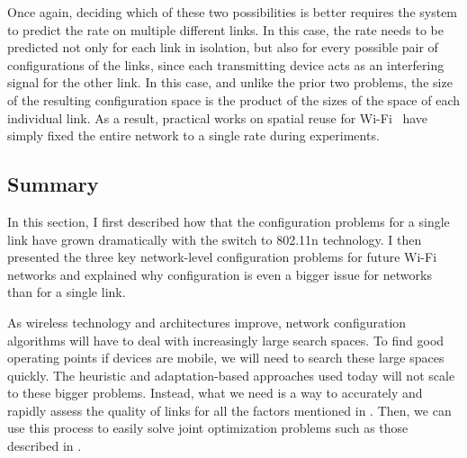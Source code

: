 Once again, deciding which of these two possibilities is better requires the system to predict the rate on multiple different links. In this case, the rate needs to be predicted not only for each link in isolation, but also for every possible pair of configurations of the links, since each transmitting device acts as an interfering signal for the other link. In this case, and unlike the prior two problems, the size of the resulting configuration space is the product of the sizes of the space of each individual link. As a result, practical works on spatial reuse for Wi-Fi~\cite{Shrivastava_CENTAUR,Vutukuru_CMAP} have simply fixed the entire network to a single rate during experiments.

\subsection{Summary}
In this section, I first described how that the configuration problems for a single link have grown dramatically with the switch to 802.11n technology. I then presented the three key network-level configuration problems for future Wi-Fi networks and explained why configuration is even a bigger issue for networks than for a single link.

As wireless technology and architectures improve, network configuration algorithms will have to deal with increasingly large search spaces. To find good operating points if devices are mobile, we will need to search these large spaces quickly.
The heuristic and adaptation-based approaches used today will not scale to these bigger problems. %
Instead, what we need is a way to accurately and rapidly assess the quality of links for all the factors mentioned in . Then, we can use this process to easily solve joint optimization problems such as those described in .



